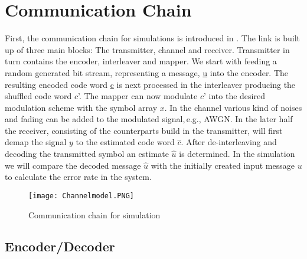 \chapter{Communication Chain} 
\label{chap:commchain}
\graphicspath{{C:/Users/Kevin/Bachelarbeit/Bachelorarbeit/01_Bachelorarbeit_LaTex/02_Figures/}}

First, the communication chain for simulations is introduced in . The link is built up of three main blocks: The transmitter, channel and receiver. Transmitter in turn contains the encoder, interleaver and mapper. We start with feeding a random generated bit stream, representing a message, \underline{u} into the encoder. The resulting encoded code word \underline{c} is next processed in the interleaver producing the shuffled code word \underline{$c$}'. The mapper can now modulate \underline{$c$}' into the desired modulation scheme with the symbol array \underline{$x$}. In the channel various kind of noises and fading can be added to the modulated signal,\,e.g., \gls{AWGN}. In the later half the receiver, consisting of the counterparts build in the transmitter, will first demap the signal \underline{$y$} to the estimated code word \underline{$\hat{c}$}. After de-interleaving and decoding the transmitted symbol an estimate \underline{$\hat{u}$} is determined. In the simulation we will compare the decoded message \underline{$\hat{u}$} with the initially created input message \underline{$u$} to calculate the error rate in the system.
\begin{figure}[!htb]
	\centering
	\texttt{[image: Channelmodel.PNG]}
	\caption{Communication chain for simulation}
	\label{fig:commchain}
\end{figure}

\section{Encoder/Decoder}
\label{sec:enc}

